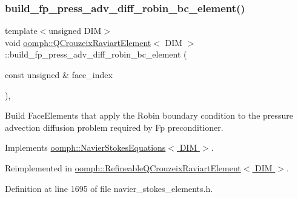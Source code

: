 \subsubsection{\texorpdfstring{build\+\_\+fp\+\_\+press\+\_\+adv\+\_\+diff\+\_\+robin\+\_\+bc\+\_\+element()}{build\_fp\_press\_adv\_diff\_robin\_bc\_element()}}
{\footnotesize\ttfamily template$<$unsigned D\+IM$>$ \\
void \hyperlink{classoomph_1_1QCrouzeixRaviartElement}{oomph\+::\+Q\+Crouzeix\+Raviart\+Element}$<$ D\+IM $>$\+::build\+\_\+fp\+\_\+press\+\_\+adv\+\_\+diff\+\_\+robin\+\_\+bc\+\_\+element (\begin{DoxyParamCaption}\item[{const unsigned \&}]{face\+\_\+index }\end{DoxyParamCaption})\hspace{0.3cm}{\ttfamily [inline]}, {\ttfamily [virtual]}}



Build Face\+Elements that apply the Robin boundary condition to the pressure advection diffusion problem required by Fp preconditioner. 



Implements \hyperlink{classoomph_1_1NavierStokesEquations_a16bfab3df70ad2204217590c0e3b7de1}{oomph\+::\+Navier\+Stokes\+Equations$<$ D\+I\+M $>$}.



Reimplemented in \hyperlink{classoomph_1_1RefineableQCrouzeixRaviartElement_a734c84a54196ba141791e7471d7c3c7d}{oomph\+::\+Refineable\+Q\+Crouzeix\+Raviart\+Element$<$ D\+I\+M $>$}.



Definition at line 1695 of file navier\+\_\+stokes\+\_\+elements.\+h.

\mbox{\label{classoomph_1_1QCrouzeixRaviartElement_a2324368cac84fd0e7d57ab5720c694ec}} 
